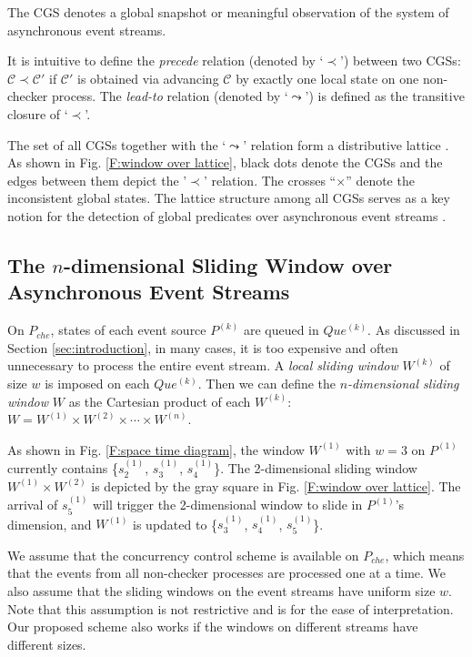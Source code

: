 \documentclass[12pt,journal,letterpaper,compsoc]{IEEEtran}
\begin{document}
\noindent The CGS denotes a global snapshot or meaningful observation of the system of asynchronous event streams.

It is intuitive to define the {\it precede} relation (denoted by `$\prec$') between two CGSs: $\mathcal{C} \prec \mathcal{C'}$ if $\mathcal{C'}$ is obtained via advancing $\mathcal{C}$ by exactly one local state on one non-checker process. The {\it lead-to} relation (denoted by `$\leadsto$') is defined as the transitive closure of `$\prec$'.

The set of all CGSs together with the `$\leadsto$' relation form a distributive lattice \cite{Babaoglu93, Schwarz94}. As shown in Fig. \ref{F:window over lattice}, black dots denote the CGSs and the edges between them depict the '$\prec$' relation. The crosses ``$\times$'' denote the inconsistent global states. The lattice structure among all CGSs serves as a key notion for the detection of global predicates over asynchronous event streams \cite{Babaoglu93, Schwarz94}.

\subsection{The $n$-dimensional Sliding Window over Asynchronous Event Streams}

On $P_{che}$, states of each event source $P^{(k)}$ are queued in $Que^{(k)}$. As discussed in Section \ref{sec:introduction}, in many cases, it is too expensive and often unnecessary to process the entire event stream. A {\it local sliding window} $W^{(k)}$ of size $w$ is imposed on each $Que^{(k)}$. Then we can define the {\it $n$-dimensional sliding window} $W$ as the Cartesian product of each $W^{(k)}$: $W = W^{(1)} \times W^{(2)} \times \cdots \times W^{(n)}$.

As shown in Fig. \ref{F:space time diagram}, the window $W^{(1)}$ with $w = 3$ on $P^{(1)}$ currently contains \{$s^{(1)}_{2}$, $s^{(1)}_{3}$, $s^{(1)}_{4}$\}. The 2-dimensional sliding window $W^{(1)}\times W^{(2)}$ is depicted by the gray square in Fig. \ref{F:window over lattice}. The arrival of $s^{(1)}_{5}$ will trigger the 2-dimensional window to slide in $P^{(1)}$'s dimension, and $W^{(1)}$ is updated to \{$s^{(1)}_{3}$, $s^{(1)}_{4}$, $s^{(1)}_{5}$\}.

We assume that the concurrency control scheme is available on $P_{che}$, which means that the events from all non-checker processes are processed one at a time. We also assume that the sliding windows on the event streams have uniform size $w$. Note that this assumption is not restrictive and is for the ease of interpretation. Our proposed scheme also works if the windows on different streams have different sizes.
\end{document}
